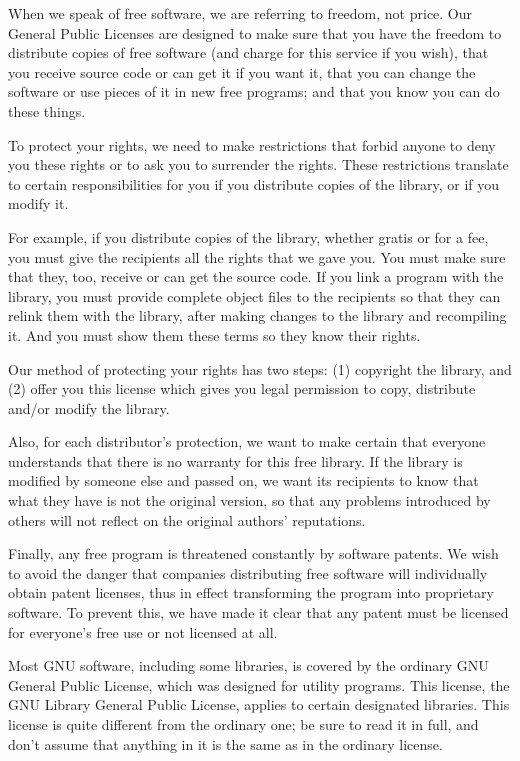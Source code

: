 When we speak of free software, we are referring to freedom, not price. Our General Public Licenses are designed to make sure that you have the freedom to distribute copies of free software (and charge for this service if you wish), that you receive source code or can get it if you want it, that you can change the software or use pieces of it in new free programs; and that you know you can do these things. 

To protect your rights, we need to make restrictions that forbid anyone to deny you these rights or to ask you to surrender the rights. These restrictions translate to certain responsibilities for you if you distribute copies of the library, or if you modify it. 

For example, if you distribute copies of the library, whether gratis or for a fee, you must give the recipients all the rights that we gave you. You must make sure that they, too, receive or can get the source code. If you link a program with the library, you must provide complete object files to the recipients so that they can relink them with the library, after making changes to the library and recompiling it. And you must show them these terms so they know their rights. 

Our method of protecting your rights has two steps: (1) copyright the library, and (2) offer you this license which gives you legal permission to copy, distribute and/or modify the library. 

Also, for each distributor's protection, we want to make certain that everyone understands that there is no warranty for this free library. If the library is modified by someone else and passed on, we want its recipients to know that what they have is not the original version, so that any problems introduced by others will not reflect on the original authors' reputations. 

Finally, any free program is threatened constantly by software patents. We wish to avoid the danger that companies distributing free software will individually obtain patent licenses, thus in effect transforming the program into proprietary software. To prevent this, we have made it clear that any patent must be licensed for everyone's free use or not licensed at all. 

Most GNU software, including some libraries, is covered by the ordinary GNU General Public License, which was designed for utility programs. This license, the GNU Library General Public License, applies to certain designated libraries. This license is quite different from the ordinary one; be sure to read it in full, and don't assume that anything in it is the same as in the ordinary license. 

